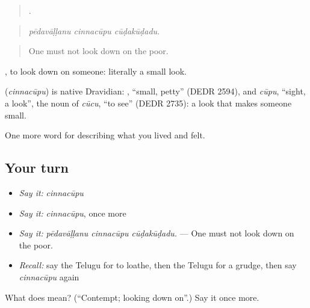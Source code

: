 \begin{quote}
  .
\end{quote}

\begin{quote}
\emph{pēdavāḷḷanu cinnacūpu cūḍakūḍadu.}
\end{quote}

\begin{quote}
One must not look down on the poor.
\end{quote}

 , to look down on someone: literally a small look.

\begin{cousinweb}
\textbf{} (\emph{cinnacūpu}) is native Dravidian: , \textquotedblleft{}small, petty\textquotedblright{} (DEDR 2594), and \emph{cūpu}, \textquotedblleft{}sight, a look\textquotedblright{}, the noun of \emph{cūcu}, \textquotedblleft{}to see\textquotedblright{} (DEDR 2735): a look that makes someone small.
\end{cousinweb}

\begin{grammarlens}[title={What you've built}]
One more word for describing what you lived and felt.
\end{grammarlens}

\subsection*{Your turn}
\begin{itemize}
\raggedright
  \item \emph{Say it:} \emph{cinnacūpu}
  \item \emph{Say it:} \emph{cinnacūpu}, once more
  \item \emph{Say it:} \emph{pēdavāḷḷanu cinnacūpu cūḍakūḍadu.} — One must not look down on the poor.
  \item \emph{Recall:} say the Telugu for to loathe, then the Telugu for a grudge, then say \emph{cinnacūpu} again
\end{itemize}

\begin{tcolorbox}[breakable,colback=teal!4,colframe=teal!35!black,title={Before you move on}]
What does  mean? (\textquotedblleft{}Contempt; looking down on\textquotedblright{}.) Say it once more.
\end{tcolorbox}
